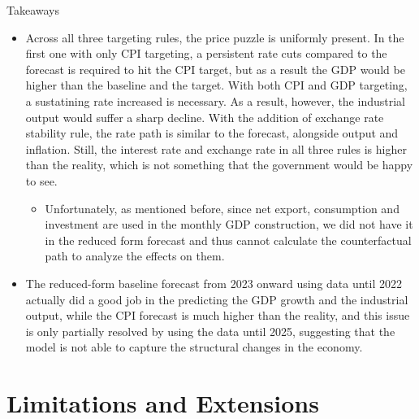 \documentclass[10pt,aspectratio=169,t]{beamer}
\begin{document}
\begin{frame}{Takeaways}
\begin{itemize}
      \item Across all three targeting rules, the price puzzle is uniformly present. In the first one with only CPI targeting, a persistent rate cuts compared to the forecast is required to hit the CPI target, but as a result the GDP would be higher than the baseline and the target. With both CPI and GDP targeting, a sustatining rate increased is necessary. As a result, however, the industrial output would suffer a sharp decline. With the addition of exchange rate stability rule, the rate path is similar to the forecast, alongside output and inflation. Still, the interest rate and exchange rate  in all three rules is higher than the reality, which is not something that the government would be happy to see.
      \begin{itemize}
            \item Unfortunately, as mentioned before, since net export, consumption and investment are used in the monthly GDP construction, we did not have it in the reduced form forecast and thus cannot calculate the counterfactual path to analyze the effects on them.
      \end{itemize}
      \item The reduced-form baseline forecast from 2023 onward using data until 2022 actually did a good job in the predicting the GDP growth and the industrial output, while the CPI forecast is much higher than the reality, and this issue is only partially resolved by using the data until 2025, suggesting that the model is not able to capture the structural changes in the economy. 
\end{itemize}
\end{frame}

\section{Limitations and Extensions}
\end{document}
